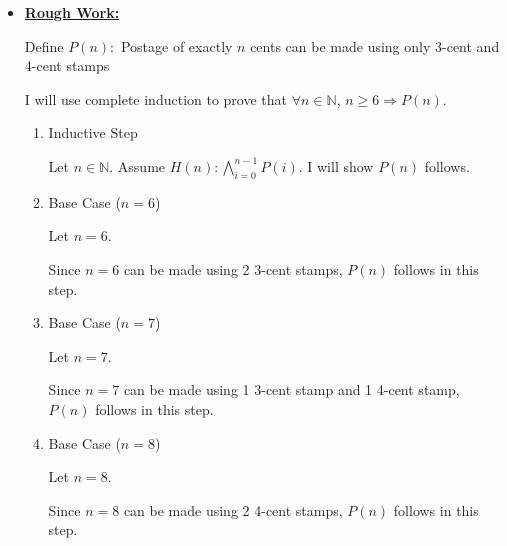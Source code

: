 \documentclass[12pt]{article}
\begin{document}
\begin{itemize}
    \item

    \bigskip

    \begin{mdframed}
    \underline{\textbf{Rough Work:}}

    \bigskip

    Define $P(n):$ Postage of exactly $n$ cents can be made using only 3-cent
    and 4-cent stamps

    \bigskip

    I will use complete induction to prove that $\forall n \in \mathbb{N}$, $n \geq 6 \Rightarrow P(n)$.

    \bigskip

    \begin{enumerate}[1.]
        \item Inductive Step

        \begin{mdframed}
        Let $n \in \mathbb{N}$. Assume $H(n): \bigwedge\limits_{i=0}^{n-1} P(i)$. I will show
        $P(n)$ follows.
        \end{mdframed}

        \item Base Case ($n = 6$)

        \begin{mdframed}
        Let $n = 6$.

        \bigskip

        Since $n = 6$ can be made using 2 3-cent stamps, $P(n)$ follows in this step.
        \end{mdframed}

        \item Base Case ($n = 7$)

        \begin{mdframed}
        Let $n = 7$.

        \bigskip

        Since $n = 7$ can be made using 1 3-cent stamp and 1 4-cent stamp, $P(n)$
        follows in this step.

        \end{mdframed}

        \item Base Case ($n = 8$)

        \begin{mdframed}
        Let $n = 8$.

        \bigskip

        Since $n = 8$ can be made using 2 4-cent stamps, $P(n)$
        follows in this step.


\end{mdframed}
\end{enumerate}
\end{mdframed}
\end{itemize}
\end{document}
